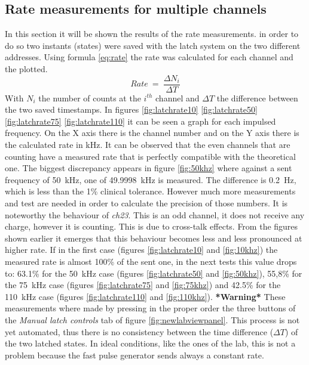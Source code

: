 \subsection{Rate measurements for multiple channels}\label{RateMeasurements}
\noindent In this section it will be shown the results of the rate measurements. in order to do so two instants (states) were saved with the latch system on the two different addresses. Using formula \ref{eq:rate} the rate was calculated for each channel and the plotted.
\begin{equation}\label{eq:rate}
	Rate\:=\: \frac{\Delta N_i}{\Delta T}
\end{equation}
\noindent With $N_i$ the number of counts at the $i^{th}$ channel and $\Delta T$ the difference between the two saved timestamps.
In figures \ref{fig:latchrate10} \ref{fig:latchrate50} \ref{fig:latchrate75} \ref{fig:latchrate110} it can be seen a graph for each impulsed frequency. On the X axis there is the channel number and on the Y axis there is the calculated rate in kHz. It can be observed that the even channels that are counting have a measured rate that is perfectly compatible with the theoretical one.
The biggest discrepancy appears in figure \ref{fig:50khz} where against a sent frequency of 50~kHz, one of 49.9998~kHz is measured. The difference is 0.2~Hz, which is less than the 1\% clinical tolerance. However much more measurements and test are needed in order to calculate the precision of those numbers.
It is noteworthy the behaviour of \textit{ch23}. This is an odd channel, it does not receive any charge, however it is counting. This is due to cross-talk effects.
From the figures shown earlier it emerges that this behaviour becomes less and less pronounced at higher rate.
If in the first case (figures \ref{fig:latchrate10} and \ref{fig:10khz}) the measured rate is almost 100\% of the sent one, in the next tests this value drops to:
63.1\% for the 50~kHz case (figures \ref{fig:latchrate50} and \ref{fig:50khz}),
55,8\% for the 75~kHz case (figures \ref{fig:latchrate75} and \ref{fig:75khz}) and
42.5\% for the 110~kHz case (figures \ref{fig:latchrate110} and \ref{fig:110khz}).
\newline
\noindent \textbf{*Warning*} These measurements where made by pressing in the proper order the three buttons of the \textit{Manual latch controls} tab of figure \ref{fig:newlabviewpanel}.
This process is not yet automated, thus there is no consistency between the time difference ($\Delta T$) of the two latched states.
In ideal conditions, like the ones of the lab, this is not a problem because the fast pulse generator sends always a constant rate.
